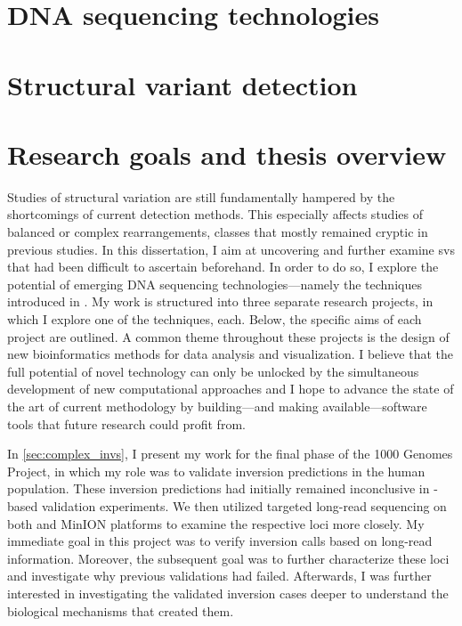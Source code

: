 \section{DNA sequencing technologies}
\label{sec:sequencing}



\section{Structural variant detection}
\label{sec:sv_detection}



\section{Research goals and thesis overview}
\label{sec:motivation}

Studies of structural variation are still fundamentally hampered by the
shortcomings of current \sv detection methods. This especially affects studies
of balanced or complex rearrangements, classes that mostly remained cryptic in
previous studies. In this dissertation, I aim at uncovering and further examine
\acp{sv} that had been difficult to ascertain beforehand. In order to do so, I
explore the potential of emerging DNA sequencing technologies---namely the
techniques introduced in .
My work is structured into three separate research projects, in which I explore
one of the techniques, each. Below, the specific aims of each project are
outlined. A common theme throughout these projects is the design of new
bioinformatics methods for data analysis and visualization. I believe that the
full potential of novel technology can only be unlocked by the simultaneous
development of new computational approaches and I hope to advance the state of
the art of current methodology by building---and making available---software
tools that future research could profit from.

In \cref{sec:complex_invs}, I present my work for the final phase of the
1000 Genomes Project, in which my role was to validate inversion predictions in
the human population. These inversion predictions had initially remained
inconclusive in \pcr-based validation experiments. We then utilized targeted
long-read sequencing on both \pacbio and \ont MinION platforms to examine the
respective loci more closely. My immediate goal in this project was to verify
inversion calls based on long-read information. Moreover, the subsequent goal
was to further characterize these loci and investigate why previous validations
had failed. Afterwards, I was further interested in investigating the validated
inversion cases deeper to understand the biological mechanisms that created
them.

